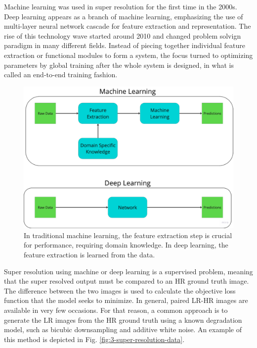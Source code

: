     Machine learning was used in super resolution for the first time in the 2000s. 
    Deep learning appears as a branch of machine learning, emphasizing the use of multi-layer neural network cascade for feature extraction and representation. 
    The rise of this technology wave started around 2010 and changed problem solvign paradigm in many different fields.
    Instead of piecing together individual feature extraction or functional modules to form a system, the focus turned to optimizing parameters by global training after the whole system is designed, in what is called an end-to-end training fashion.

    \begin{figure}[H]
        \centering
        \includegraphics[width=\textwidth]{Includes/2-end-to-end-training.pdf}
        \caption{In traditional machine learning, the feature extraction step is crucial for performance, requiring domain knowledge. In deep learning, the feature extraction is learned from the data.}
        \label{fig:2-end-to-end-training}
    \end{figure}

    Super resolution using machine or deep learning is a supervised problem, meaning that the super resolved output must be compared to an HR ground truth image. 
    The difference between the two images is used to calculate the objective loss function that the model seeks to minimize.
    In general, paired LR-HR images are available in very few occasions.
    For that reason, a common approach is to generate the LR images from the HR ground truth using a known degradation model, such as bicubic downsampling and additive white noise. An example of this method is depicted in Fig. \ref{fig:3-super-resolution-data}. 
    
